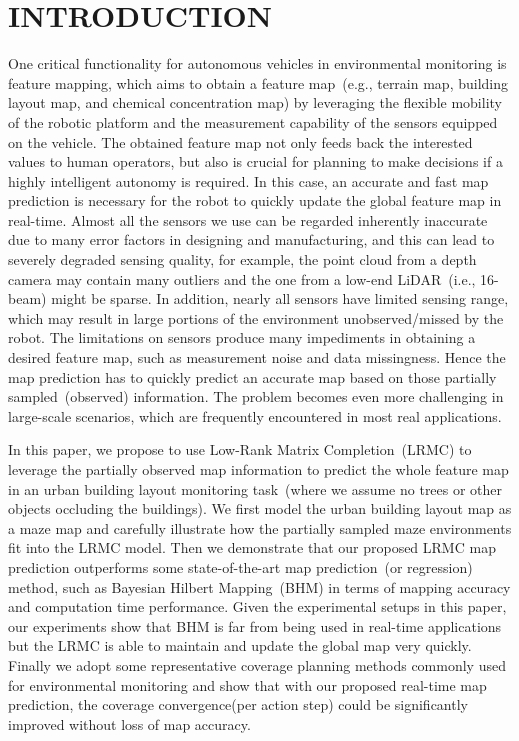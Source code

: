 \section{INTRODUCTION}
One critical functionality for autonomous vehicles in environmental monitoring is feature mapping, which aims to obtain a feature map~(e.g., terrain map, building layout map, and chemical concentration map) by leveraging the flexible mobility of the robotic platform and the measurement capability of the sensors equipped on the vehicle. The obtained feature map not only feeds back the interested values to human operators, but also is crucial for planning to make decisions if a highly intelligent autonomy is required. In this case, an accurate and fast map prediction is necessary for the robot to quickly update the global feature map in real-time. Almost all the sensors we use can be regarded inherently inaccurate due to many error factors in designing and manufacturing, and this can lead to severely degraded sensing quality, for example, the point cloud from a depth camera may contain many outliers and the one from a low-end LiDAR~(i.e., 16-beam) might be sparse. In addition, nearly all sensors have limited sensing range, which may result in large portions of the environment unobserved/missed by the robot. The limitations on sensors produce many impediments in obtaining a desired feature map, such as measurement noise and data missingness. Hence the map prediction has to quickly predict an accurate map based on those partially sampled~(observed) information. The problem becomes even more challenging in large-scale scenarios, which are frequently encountered in most real applications.

In this paper, we propose to use Low-Rank Matrix Completion~(LRMC) to leverage the partially observed map information to predict the whole feature map in an urban building layout monitoring task~(where we assume no trees or other objects occluding the buildings). We first model the urban building layout map as a maze map and carefully illustrate how the partially sampled maze environments fit into the LRMC model. Then we demonstrate that our proposed LRMC map prediction outperforms some state-of-the-art map prediction~(or regression) method, such as Bayesian Hilbert Mapping~(BHM) in terms of mapping accuracy and computation time performance. Given the experimental setups in this paper, our experiments show that BHM is far from being used in real-time applications but the LRMC is able to maintain and update the global map very quickly. Finally we adopt some representative coverage planning methods commonly used for environmental monitoring and show that with our proposed real-time map prediction, the coverage convergence(per action step) could be significantly improved without loss of map accuracy. 

